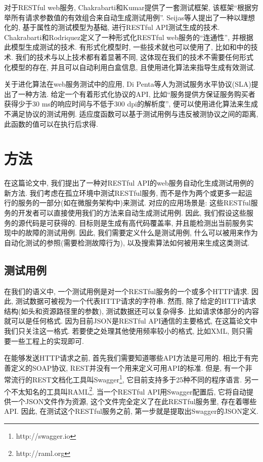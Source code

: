     对于RESTful web服务, Chakrabarti和Kumar\cite{chakrabarti2009test}提供了一套测试框架, 该框架“根据穷举所有请求参数值的有效组合来自动生成测试用例”.  Seijas等人\cite{lamela2013towards}提出了一种以理想化的, 基于属性的测试模型为基础, 进行RESTful API测试生成的技术. Chakrabarti和Rodriquez\cite{chakrabarti2010connectedness}定义了一种形式化RESTful web服务的“连通性”, 并根据此模型生成测试的技术. 有形式化模型时, 一些技术就也可以使用了, 比如\cite{pinheiro2013model}和\cite{fertig2015model}中的技术. 我们的技术与以上技术都有着显著不同, 这体现在我们的技术不需要任何形式化模型的存在, 并且可以自动利用白盒信息, 且使用进化算法来指导生成有效测试.
    
    关于进化算法在web服务测试中的应用, Di Penta等人\cite{di2007search}为测试服务水平协议(SLA)提出了一种方法. 给定一个有着形式化协议的API, 比如“服务提供方保证服务购买者获得少于30 ms的响应时间与不低于300 dpi的解析度”, 便可以使用进化算法来生成不满足协议的测试用例. 适应度函数可以基于测试用例与违反被测协议之间的距离, 此函数的值可以在执行后求得. 

\section{方法}

  在这篇论文中, 我们提出了一种对RESTful API的web服务自动化生成测试用例的新方法. 我们考虑在孤立环境中测试RESTful服务, 而不是作为两个或更多一起运行的服务的一部分(如在微服务架构中)来测试. 对应的应用场景是: 这些RESTful服务的开发者可以直接使用我们的方法来自动生成测试用例. 因此, 我们假设这些服务的源代码是可获得的. 目标则是生成有高代码覆盖率, 并且能检测出当前服务实现中的故障的测试用例. 因此, 我们需要定义什么是测试用例, 什么可以被用来作为自动化测试的参照(需要检测故障行为), 以及搜索算法如何被用来生成这类测试. 
    
    \subsection{测试用例}
    在我们的语义中, 一个测试用例是对一个RESTful服务的一个或多个HTTP请求. 因此, 测试数据可被视为一个代表HTTP请求的字符串. 然而, 除了给定的HTTP请求结构(如头和资源路径里的参数), 测试数据还可以复杂得多. 比如请求体部分的内容就可以是任何格式. 因为目前JSON是RESTful API通信的主要格式, 在这篇论文中我们只关注这一格式. 若要使之处理其他使用频率较小的格式, 比如XML, 则只需要一些工程上的实现即可. 
    
    在能够发送HTTP请求之前, 首先我们需要知道哪些API方法是可用的. 相比于有完善定义的SOAP协议, REST并没有一个用来定义可用API的标准. 但是, 有一个非常流行的REST文档化工具叫Swagger\footnote{http://swagger.io}, 它目前支持多于25种不同的程序语言. 另一个不太知名的工具叫RAML\footnote{http://raml.org}. 当一个RESTful API用Swagger配置后, 它将自动提供一个JSON文件作为资源, 这个文件完全定义了在此RESTful服务里, 存在着哪些API. 因此, 在测试这个RESTful服务之前, 第一步就是提取出Swagger的JSON定义. 
    
